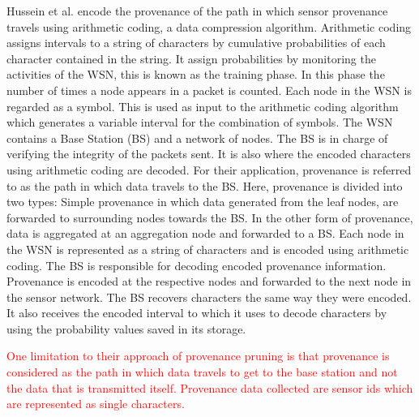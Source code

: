 Hussein et al. \cite{hussain_secure_2014} encode the provenance of the path in which  sensor provenance travels using arithmetic coding, a data compression algorithm. Arithmetic coding assigns intervals to a string of characters by  cumulative probabilities of each character contained in the string. It assign probabilities by monitoring the activities of the WSN, this is known as the training phase. In this phase the number of times a node appears in a packet is counted. Each node in the WSN is regarded as a symbol. This is used as input to the arithmetic coding algorithm which generates a variable interval for the combination of symbols. The WSN contains a Base Station (BS) and a network of nodes. The BS is in charge of verifying the integrity of the packets sent. It is also where the encoded characters using arithmetic coding are decoded. For their application, provenance is referred to as the path in which data travels to the BS. Here, provenance is divided into two types: Simple provenance in which data generated from the leaf nodes, are forwarded to surrounding nodes towards the BS. In the other form of provenance, data is aggregated at an aggregation node and forwarded to a BS. Each node in the WSN is represented as a string of characters and is encoded using arithmetic coding. The BS is responsible for decoding encoded provenance information. Provenance is encoded at the respective nodes and forwarded to the next node in the sensor network. The BS recovers characters the same way they were encoded. It also receives the encoded interval to which it uses to decode characters by using the probability values saved in its storage.

\textcolor{red}{ One limitation to their approach of provenance pruning is that provenance is considered as the path in which data travels to get to the base station and not the data that is transmitted itself. Provenance data collected are sensor ids which are represented as single characters. }



















